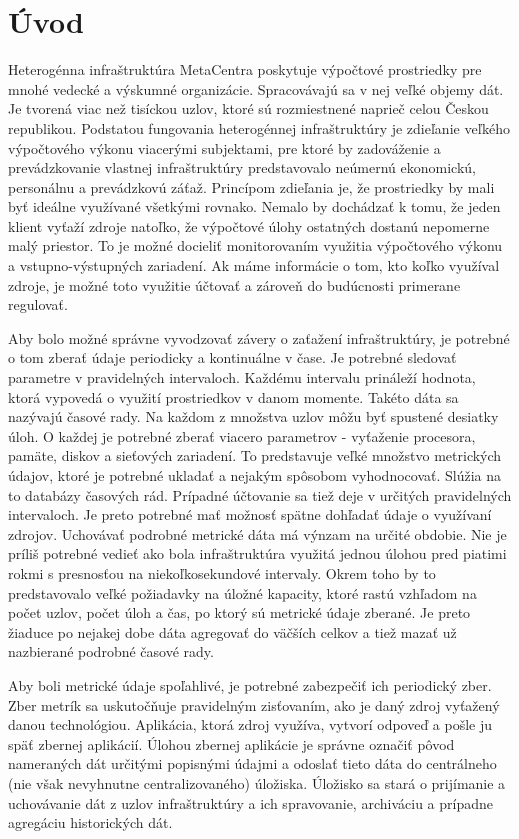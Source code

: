 \documentclass[12pt,twoside,color,cover,table]{fithesis3}
\begin{document}
\chapter{Úvod}
Heterogénna infraštruktúra MetaCentra poskytuje výpočtové prostriedky pre mnohé vedecké a výskumné organizácie. Spracovávajú sa v nej veľké objemy dát. Je tvorená viac než tisíckou uzlov, ktoré sú
rozmiestnené naprieč celou
Českou republikou. Podstatou fungovania heterogénnej infraštruktúry je zdieľanie veľkého výpočtového výkonu viacerými subjektami, pre ktoré by zadováženie a prevádzkovanie vlastnej infraštruktúry predstavovalo neúmernú 
ekonomickú, personálnu a prevádzkovú záťaž. Princípom zdieľania je, že prostriedky by mali byť ideálne využívané všetkými rovnako. Nemalo by dochádzať k tomu, že jeden klient vyťaží zdroje natoľko, že 
výpočtové úlohy ostatných dostanú nepomerne malý priestor. To je možné docieliť monitorovaním využitia výpočtového výkonu a vstupno-výstupných zariadení. Ak máme informácie o tom, kto koľko využíval zdroje, 
je možné toto využitie účtovať a zároveň do budúcnosti primerane regulovať. 

Aby bolo možné správne vyvodzovať závery o zaťažení infraštruktúry, je potrebné o tom zberať údaje periodicky a kontinuálne v čase. Je potrebné sledovať parametre v pravidelných intervaloch. Každému intervalu 
prináleží hodnota, ktorá vypovedá o využití prostriedkov v danom momente. Takéto dáta sa nazývajú časové rady. Na každom z množstva uzlov môžu byť spustené desiatky úloh. O každej je
potrebné zberať viacero parametrov - vyťaženie procesora, pamäte, diskov a sieťových zariadení. To predstavuje veľké množstvo metrických údajov, ktoré je potrebné ukladať a nejakým spôsobom vyhodnocovať. 
Slúžia na to 
databázy časových rád. Prípadné účtovanie sa tiež deje v určitých pravidelných intervaloch. Je preto potrebné mať možnosť spätne dohľadať údaje o využívaní zdrojov. Uchovávať podrobné metrické dáta má výnzam na určité
obdobie. Nie je príliš potrebné vedieť ako bola infraštruktúra využitá jednou úlohou pred piatimi rokmi s presnosťou na niekoľkosekundové intervaly. Okrem toho by to predstavovalo veľké požiadavky na úložné kapacity, 
ktoré rastú vzhľadom na počet uzlov, počet úloh a čas, po ktorý sú metrické údaje zberané. Je preto žiaduce po nejakej dobe dáta agregovať do väčších celkov a tiež mazať už nazbierané podrobné časové rady.

Aby boli metrické údaje spoľahlivé, je potrebné zabezpečiť ich periodický zber. Zber metrík sa uskutočňuje pravidelným zisťovaním, ako je daný zdroj vyťažený danou technológiou. 
Aplikácia, ktorá zdroj využíva, vytvorí odpoveď a pošle ju späť zbernej aplikácií. Úlohou zbernej aplikácie je správne označiť pôvod nameraných dát určitými popisnými údajmi a odoslať tieto dáta
do centrálneho (nie však nevyhnutne centralizovaného) úložiska. Úložisko sa stará o prijímanie a uchovávanie dát z uzlov infraštruktúry a ich spravovanie, archiváciu a prípadne agregáciu historických dát.
\end{document}
